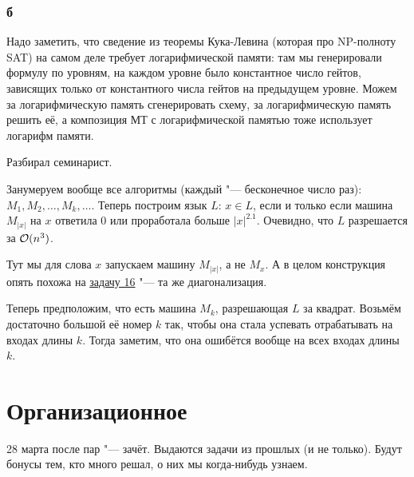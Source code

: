 	\subsubsection{б}
		Надо заметить, что сведение из теоремы Кука-Левина (которая про NP-полноту SAT) на самом деле требует логарифмической памяти:
		там мы генерировали формулу по уровням, на каждом уровне было константное число гейтов,
		зависящих только от константного числа гейтов на предыдущем уровне.
		Можем за логарифмическую память сгенерировать схему, за логарифмическую память решить её, а композиция МТ
		с логарифмической памятью тоже использует логарифм памяти.

	Разбирал семинарист.

	Занумеруем вообще все алгоритмы (каждый "--- бесконечное число раз): $M_1, M_2, \dots, M_k, \dots$.
	Теперь построим язык $L$: $x \in L$, если и только если машина $M_{|x|}$ на $x$ ответила 0 или проработала
	больше $|x|^{2.1}$.
	Очевидно, что $L$ разрешается за $\mathcal O(n^3)$.
	\begin{Rem}
		Тут мы для слова $x$ запускаем машину $M_{|x|}$, а не $M_x$.
		А в целом конструкция опять похожа на \hyperref[prob16]{задачу 16} "--- та же диагонализация.
	\end{Rem}

	Теперь предположим, что есть машина $M_k$, разрешающая $L$ за квадрат.
	Возьмём достаточно большой её номер $k$ так, чтобы она стала успевать отрабатывать на входах длины $k$.
	Тогда заметим, что она ошибётся вообще на всех входах длины $k$.

\section{Организационное}
	28 марта после пар "--- зачёт.
	Выдаются задачи из прошлых (и не только).
	Будут бонусы тем, кто много решал, о них мы когда-нибудь узнаем.

